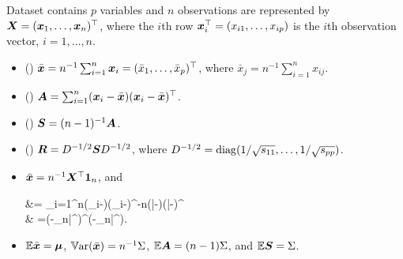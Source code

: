 \documentclass[10pt,a4paper]{book}
\begin{document}
\begin{defbox}
	\begin{definition}\label{def:sample_mean_etc}
		Dataset contains $p$ variables and $n$ observations are represented by 
		${\boldsymbol X} = ({\boldsymbol x}_{1},\ldots,{\boldsymbol x}_n)^\top$, where the $i$th row ${\boldsymbol x}_i^\top=(x_{i1},\ldots,x_{ip})$ is the $i$th observation vector, $i=1,\ldots,n$. 
		\begin{itemize}
			\item () $\bar{{\boldsymbol x}}=n^{-1}\sum_{i=1}^{n}{\boldsymbol x}_i=(\bar{x}_1,\ldots,\bar{x}_p)^\top$, where $\bar{x}_j=n^{-1}\sum_{i=1}^{n}x_{ij}$.
			\item () ${\boldsymbol A}=\sum_{i=1}^{n}({\boldsymbol x}_i-\bar{{\boldsymbol x}})({\boldsymbol x}_i-\bar{{\boldsymbol x}})^\top$.
			\item () ${\boldsymbol S}=(n-1)^{-1}{\boldsymbol A}$.
			\item () ${\boldsymbol R}=D^{-1/2}{\boldsymbol S} D^{-1/2}$, where $D^{-1/2}=\mathrm{diag}(1/\sqrt{s_{11}},\ldots,1/\sqrt{s_{pp}})$.
		\end{itemize}
	\end{definition}
\end{defbox}
\begin{itemize}
	\item $\bar{{\boldsymbol x}}=n^{-1}{\boldsymbol X}^\top{\boldsymbol 1}_n$, and
	\begin{sequation*}
		\begin{aligned}
			\A&= \sum_{i=1}^{n}(\x_i-\bam)(\x_i-\bam)^\TT-n(\bar{\x}-\bam)(\bar{\x}-\bam)^\TT \\ & =(\X-\1_n\bar{\x}^\TT)^\TT(\X-\1_n\bar{\x}^\TT)\succeq \0.
		\end{aligned}
	\end{sequation*}
	\item $\mathbb E\bar{{\boldsymbol x}}={\boldsymbol\mu}$, $\mathbb{V}\mathrm{ar}(\bar{{\boldsymbol x}})=n^{-1}\Sigma$, $\mathbb E {\boldsymbol A}=(n-1)\Sigma$, and $\mathbb E {\boldsymbol S}=\Sigma$.
\end{itemize}
\end{document}
